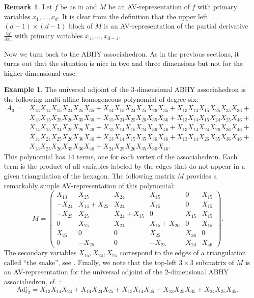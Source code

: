 \documentclass[a4paper,10pt]{amsart}
\theoremstyle{definition}
\newtheorem{ex}[Def]{Example}
\newtheorem{rem}[Def]{Remark}
\theoremstyle{plain}
\begin{document}
\begin{rem}\label{rem:derivativeAVrep}
    Let $f$ be as in  and $M$ be an AV-representation of $f$ with primary variables $x_1,\ldots,x_d$. 
    It is clear from the definition that the upper left $(d-1)\times(d-1)$ block of $M$ is an AV-representation of the partial derivative $\frac{\partial f}{\partial x_d}$ with primary variables $x_1,\ldots,x_{d-1}$.
\end{rem}
Now we turn back to the ABHY associahedron. As in the previous sections, it turns out that the situation is nice in two and three dimensions but not for the higher dimensional case.
\begin{ex}\label{ex:3dassoc}
    The universal adjoint of the $3$-dimensional ABHY associahedron  is the following multi-affine homogeneous polynomial of degree six:
    \begin{align*} A_3 =& X_{13}X_{14}X_{15}X_{24}X_{25}X_{35}+X_{14}X_{15}X_{24}X_{25}X_{26}X_{35}+X_{13}X_{14}X_{15}X_{25}X_{35}X_{36}+\\&X_{13}X_{15}X_{25}X_{26}X_{35}X_{36}+X_{15}X_{24}X_{25}X_{26}X_{35}X_{36}+X_{13}X_{14}X_{15}X_{24}X_{25}X_{46}+\\&X_{14}X_{15}X_{24}X_{25}X_{26}X_{46}+X_{13}X_{14}X_{15}X_{24}X_{36}X_{46}+X_{13}X_{14}X_{24}X_{26}X_{36}X_{46}+\\&X_{14}X_{24}X_{25}X_{26}X_{36}X_{46}+X_{13}X_{14}X_{15}X_{35}X_{36}X_{46}+X_{13}X_{14}X_{26}X_{35}X_{36}X_{46}+\\&X_{13}X_{25}X_{26}X_{35}X_{36}X_{46}+X_{24}X_{25}X_{26}X_{35}X_{36}X_{46}.
    \end{align*}
    This polynomial has $14$ terms, one for each vertex of the associahedron. Each term is the product of all variables labeled by the edges that do not appear in a given triangulation of the hexagon. The following matrix $M$ provides a remarkably simple AV-representation of this polynomial:
    $$M =  \begin{pmatrix}
        X_{13}& X_{25}& X_{24}& X_{15}& 0& X_{15}\\ -X_{24}& X_{14} + X_{25}& X_{24}& X_{15}& 0& X_{15}\\ -X_{25}& X_{25}& X_{24} + X_{35}& 0& X_{15}& X_{15}\\ 0& X_{25}& X_{24}& X_{15} + X_{26}& 0& X_{15}\\ X_{25}& 0& 0& X_{25}& X_{36}& 0\\ 0& -X_{25}& 0& -X_{25}& X_{24}& X_{46}
    \end{pmatrix}.$$
    The secondary variables $X_{15},X_{24},X_{25}$ correspond to the edges of a triangulation called  ``the snake'', see . Finally, we note that the top-left $3\times3$ submatrix of $M$ is an AV-representation for the universal adjoint of the $2$-dimensional ABHY associahedron, cf. :
    \begin{equation*}
        \mathrm{Adj}_2=X_{13} X_{14} X_{24} + X_{14} X_{24} X_{25} + X_{13} X_{14} X_{35} + X_{13} X_{25} X_{35} + X_{24} X_{25} X_{35}.
    \end{equation*}
\end{ex}
\end{document}
